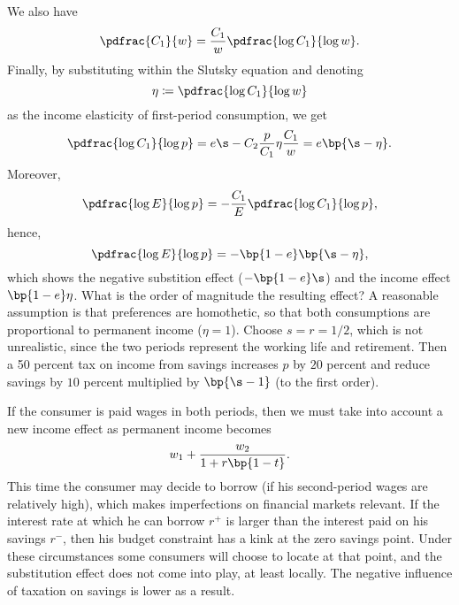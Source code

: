 We also have 
\begin{equation}
    \notag 
    \pdfrac{C_1}{w} = \frac{C_1}{w} \pdfrac{\log C_1}{\log w}.
\end{equation}
Finally, by substituting within the Slutsky equation and denoting 
\begin{equation}
    \notag 
    \eta \coloneqq \pdfrac{\log C_1}{\log w}
\end{equation}
as the income elasticity of first-period consumption, we get 
\begin{equation}
    \notag 
    \pdfrac{\log C_1}{\log p} = e \s - C_2 \frac{p}{C_1} \eta \frac{C_1}{w} = e\bp{\s - \eta}.
\end{equation}
Moreover, 
\begin{equation}
    \notag 
    \pdfrac{\log E}{\log p} = - \frac{C_1}{E} \pdfrac{\log C_1}{\log p},
\end{equation}
hence, 
\begin{equation}
    \notag 
    \pdfrac{\log E}{\log p} = -\bp{1-e}\bp{\s-\eta},
\end{equation}
which shows the negative substition effect ($-\bp{1-e}\s$) and the income effect $\bp{1-e}\eta$. What is the order of magnitude the resulting effect?  A reasonable assumption is that preferences are homothetic, so that both consumptions are proportional to permanent income ($\eta = 1$). Choose $s = r = 1 / 2$, which is not unrealistic, since the two periods represent the working life and retirement. Then a 50 percent tax on income from savings increases $p$ by $20$ percent and reduce savings by $10$ percent multiplied by $\bp{\s - 1}$ (to the first order). 

If the consumer is paid wages in both periods, then we must take into account a new income effect as permanent income becomes 
\begin{equation}
    \notag 
    w_1 + \frac{w_2}{1 + r \bp{1-t}}.
\end{equation}
This time the consumer may decide to borrow (if his second-period wages are relatively high), which makes imperfections on financial markets relevant. If the interest rate at which he can borrow $r^+$ is larger than the interest paid on his savings $r^-$, then his budget constraint has a kink at the zero savings point. Under these circumstances some consumers will choose to locate at that point, and the substitution effect does not come into play, at least locally. The negative influence of taxation on savings is lower as a result.


